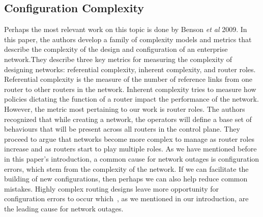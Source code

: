 \subsection{Configuration Complexity} 

Perhaps the most relevant work on this topic is done by Benson \textit{et al} 2009. In this paper, the authors develop a family of complexity models and metrics that describe the complexity of the design and configuration of an enterprise network.They describe three key metrics for measuring the complexity of designing networks: referential complexity, inherent complexity, and router roles. Referential complexity is the measure of the number of reference links from one router to other routers in the network. Inherent complexity tries to measure how policies dictating the function of a router impact the performance of the network. However, the metric most pertaining to our work is router roles. The authors recognized that while creating a network, the operators will define a base set of behaviours that will be present across all routers in the control plane. They proceed to argue that networks become more complex to manage as router roles increase and as routers start to play multiple roles. As we have mentioned before in this paper’s introduction, a common cause for network outages is configuration errors, which stem from the complexity of the network. If we can facilitate the building of new configurations, then perhaps we can also help reduce common mistakes. Highly complex routing designs leave more opportunity for configuration errors to occur which~\cite{cutting-edge}, as we mentioned in our introduction, are the leading cause for network outages.